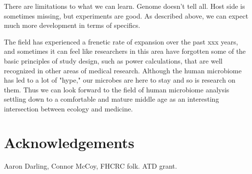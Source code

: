 \documentclass{amsart}
\newcommand{\forarxiv}[1]{#1}
\newcommand{\notforarxiv}[1]{}
\newcommand{\FIGmassTransport}{\
\begin{figure}[ht]
\begin{center}
  \forarxiv{\texttt{[image: mass\_transport.pdf]}}
\end{center}
\caption{\
  Caption goes here.
}
\label{FIGmassTransport}
\end{figure}
}
\begin{document}
There are limitations to what we can learn.
Genome doesn't tell all.
Host side is sometimes missing, but experiments are good.
As described above, we can expect much more development in terms of specifics.
\cite{hooper2012interactions}

The field has experienced a frenetic rate of expansion over the past xxx years, and sometimes it can feel like researchers in this area have forgotten some of the basic principles of study design, such as power calculations, that are well recognized in other areas of medical research.
Although the human microbiome has led to a lot of "hype," our microbes are here to stay and so is research on them.
Thus we can look forward to the field of human microbiome analysis settling down to a comfortable and mature middle age as an interesting intersection between ecology and medicine.


\section{Acknowledgements}
Aaron Darling, Connor McCoy,
FHCRC folk.
ATD grant.


\notforarxiv{
\newpage
\section{Figure Legends}
\clearpage

\newpage
}



\end{document}
